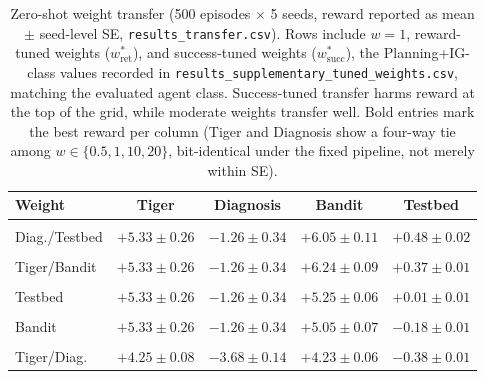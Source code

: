 \begin{table}[ht]
\centering
\caption{Zero-shot weight transfer (500 episodes $\times$ 5 seeds, reward reported as mean $\pm$ seed-level SE, \texttt{results\_\allowbreak transfer.csv}). Rows include $w{=}1$, reward-tuned weights ($w^*_{\mathrm{ret}}$), and success-tuned weights ($w^*_{\mathrm{succ}}$), the Planning+IG-class values recorded in \texttt{results\_\allowbreak supplementary\_\allowbreak tuned\_\allowbreak weights.csv}, matching the evaluated agent class. Success-tuned transfer harms reward at the top of the grid, while moderate weights transfer well. Bold entries mark the best reward per column (Tiger and Diagnosis show a four-way tie among $w \in \{0.5, 1, 10, 20\}$, bit-identical under the fixed pipeline, not merely within SE).}
\label{tab:transfer}
\begin{tablebody}
\begin{tabular}{lcccc}
\toprule
Weight & Tiger & Diagnosis & Bandit & Testbed \\
\midrule
\shortstack[l]{$w{=}0.5$ ($w^*_{\mathrm{ret}}$)\\Diag./Testbed} & $\mathbf{+5.33 \pm 0.26}$ & $\mathbf{-1.26 \pm 0.34}$ & $+6.05 \pm 0.11$ & $\mathbf{+0.48 \pm 0.02}$ \\
\shortstack[l]{$w{=}1$ (EFE / $w^*_{\mathrm{ret}}$)\\Tiger/Bandit} & $\mathbf{+5.33 \pm 0.26}$ & $\mathbf{-1.26 \pm 0.34}$ & $\mathbf{+6.24 \pm 0.09}$ & $+0.37 \pm 0.01$ \\
\shortstack[l]{$w{=}10$ ($w^*_{\mathrm{succ}}$)\\Testbed} & $\mathbf{+5.33 \pm 0.26}$ & $\mathbf{-1.26 \pm 0.34}$ & $+5.25 \pm 0.06$ & $+0.01 \pm 0.01$ \\
\shortstack[l]{$w{=}20$ ($w^*_{\mathrm{succ}}$)\\Bandit} & $\mathbf{+5.33 \pm 0.26}$ & $\mathbf{-1.26 \pm 0.34}$ & $+5.05 \pm 0.07$ & $-0.18 \pm 0.01$ \\
\shortstack[l]{$w{=}50$ ($w^*_{\mathrm{succ}}$)\\Tiger/Diag.} & $+4.25 \pm 0.08$ & $-3.68 \pm 0.14$ & $+4.23 \pm 0.06$ & $-0.38 \pm 0.01$ \\
\bottomrule
\end{tabular}
\end{tablebody}
\end{table}

